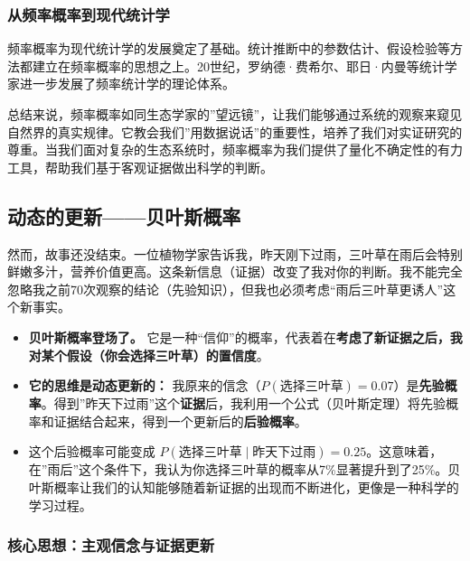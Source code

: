 \documentclass[
]{book}
\providecommand{\tightlist}{%
  \setlength{\itemsep}{0pt}\setlength{\parskip}{0pt}}
\begin{document}
\hypertarget{ux4eceux9891ux7387ux6982ux7387ux5230ux73b0ux4ee3ux7edfux8ba1ux5b66}{%
\subsubsection{从频率概率到现代统计学}\label{ux4eceux9891ux7387ux6982ux7387ux5230ux73b0ux4ee3ux7edfux8ba1ux5b66}}

频率概率为现代统计学的发展奠定了基础。统计推断中的参数估计、假设检验等方法都建立在频率概率的思想之上。20世纪，罗纳德·费希尔、耶日·内曼等统计学家进一步发展了频率统计学的理论体系。

总结来说，频率概率如同生态学家的''望远镜''，让我们能够通过系统的观察来窥见自然界的真实规律。它教会我们''用数据说话''的重要性，培养了我们对实证研究的尊重。当我们面对复杂的生态系统时，频率概率为我们提供了量化不确定性的有力工具，帮助我们基于客观证据做出科学的判断。

\hypertarget{ux52a8ux6001ux7684ux66f4ux65b0ux8d1dux53f6ux65afux6982ux7387}{%
\subsection{动态的更新------贝叶斯概率}\label{ux52a8ux6001ux7684ux66f4ux65b0ux8d1dux53f6ux65afux6982ux7387}}

然而，故事还没结束。一位植物学家告诉我，昨天刚下过雨，三叶草在雨后会特别鲜嫩多汁，营养价值更高。这条新信息（证据）改变了我对你的判断。我不能完全忽略我之前70次观察的结论（先验知识），但我也必须考虑``雨后三叶草更诱人''这个新事实。

\begin{itemize}
\tightlist
\item
  \textbf{贝叶斯概率登场了。} 它是一种``信仰''的概率，代表着在\textbf{考虑了新证据之后，我对某个假设（你会选择三叶草）的置信度}。
\item
  \textbf{它的思维是动态更新的：} 我原来的信念（\(P(\text{选择三叶草}) = 0.07\)）是\textbf{先验概率}。得到''昨天下过雨''这个\textbf{证据}后，我利用一个公式（贝叶斯定理）将先验概率和证据结合起来，得到一个更新后的\textbf{后验概率}。
\item
  这个后验概率可能变成 \(P(\text{选择三叶草} \mid \text{昨天下过雨}) = 0.25\)。这意味着，在''雨后''这个条件下，我认为你选择三叶草的概率从7\%显著提升到了25\%。贝叶斯概率让我们的认知能够随着新证据的出现而不断进化，更像是一种科学的学习过程。
\end{itemize}

\hypertarget{ux6838ux5fc3ux601dux60f3ux4e3bux89c2ux4fe1ux5ff5ux4e0eux8bc1ux636eux66f4ux65b0}{%
\subsubsection{核心思想：主观信念与证据更新}\label{ux6838ux5fc3ux601dux60f3ux4e3bux89c2ux4fe1ux5ff5ux4e0eux8bc1ux636eux66f4ux65b0}}
\end{document}
